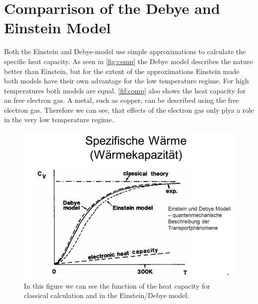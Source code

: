 \section{Comparrison of the Debye and Einstein Model}
\label{sec:comp_DE}
Both the Einstein and Debye-model use simple approximations to calculate the specific heat capacity. As seen in \autoref{fig:comp} the Debye model describes the nature better than Einstein, 
but for the extent of the approximations Einstein made both models have their own advantage for the low temperature regime. For high temperatures both models are equal. \autoref{fif:comp}
also shows the heat capacity for an free electron gas. A metal, such as copper, can be described using the free electron gas. Therefore we can see, that effects of the electron gas 
only plya a role in the very low temperature regime.
\begin{figure}
    \centering
    \includegraphics[scale=0.4]{content/V47_pictures/comp.PNG}
    \caption{In this figure we can see the function of the heat capacity for classical calculation and in the Einstein/Debye model.}
    \label{fig:comp}
\end{figure}